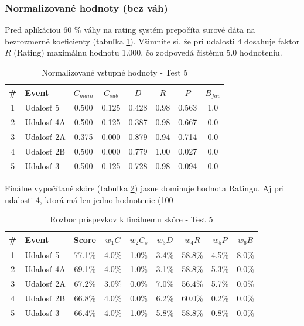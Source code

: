 \subsubsection{Normalizované hodnoty (bez váh)}

Pred aplikáciou 60 \% váhy na rating systém prepočíta surové dáta na bezrozmerné koeficienty (tabuľka \ref{tab:norm_test5}). Všimnite si, že pri udalosti 4 dosahuje faktor $R$ (Rating) maximálnu hodnotu 1.000, čo zodpovedá čistému 5.0 hodnoteniu.

\begin{table}[H]
\centering
\small
\begin{tabular}{|c|l|c|c|c|c|c|c|}
\hline
\textbf{\#} & \textbf{Event} & $C_{main}$ & $C_{sub}$ & $D$ & $R$ & $P$ & $B_{fav}$ \\
\hline
1 & Udalosť 5  & 0.500 & 0.125 & 0.428 & 0.98 & 0.563 & 1.0 \\
2 & Udalosť 4A & 0.500 & 0.125 & 0.387 & 0.98 & 0.667 & 0.0 \\
3 & Udalosť 2A & 0.375 & 0.000 & 0.879 & 0.94 & 0.714 & 0.0 \\
4 & Udalosť 2B & 0.500 & 0.000 & 0.779 & 1.00 & 0.027 & 0.0 \\
5 & Udalosť 3  & 0.500 & 0.125 & 0.728 & 0.98 & 0.094 & 0.0 \\
\hline
\end{tabular}
\caption{Normalizované vstupné hodnoty - Test 5}
\label{tab:norm_test5}
\end{table}

Finálne vypočítané skóre (tabuľka \ref{tab:vysledky_test5}) jasne dominuje hodnota Ratingu. Aj pri udalosti 4, ktorá má len jedno hodnotenie (100 %

\begin{table}[H]
\centering
\small
\begin{tabular}{|c|l|c|c|c|c|c|c|c|}
\hline
\textbf{\#} & \textbf{Event} & \textbf{Score} & $w_1 C$ & $w_2 C_s$ & $w_3 D$ & $w_4 R$ & $w_5 P$ & $w_6 B$ \\
\hline
1 & Udalosť 5  & 77.1\% & 4.0\% & 1.0\% & 3.4\% & 58.8\% & 4.5\% & 8.0\% \\
2 & Udalosť 4A & 69.1\% & 4.0\% & 1.0\% & 3.1\% & 58.8\% & 5.3\% & 0.0\% \\
3 & Udalosť 2A & 67.2\% & 3.0\% & 0.0\% & 7.0\% & 56.4\% & 5.7\% & 0.0\% \\
4 & Udalosť 2B & 66.8\% & 4.0\% & 0.0\% & 6.2\% & 60.0\% & 0.2\% & 0.0\% \\
5 & Udalosť 3  & 66.4\% & 4.0\% & 1.0\% & 5.8\% & 58.8\% & 0.8\% & 0.0\% \\
\hline
\end{tabular}
\caption{Rozbor príspevkov k finálnemu skóre - Test 5}
\label{tab:vysledky_test5}
\end{table}

